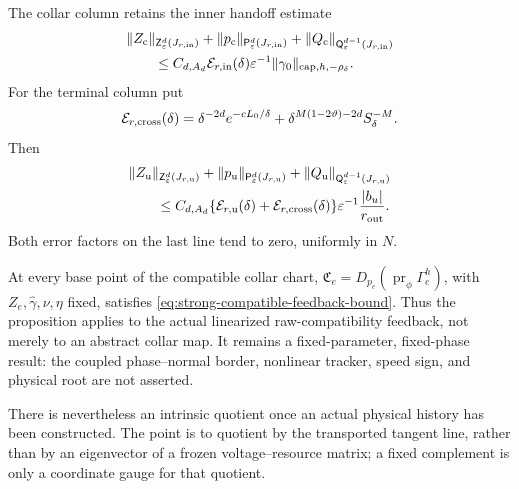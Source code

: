 \begin{proposition}
The collar column retains the inner handoff estimate
\begin{align}
 &\|Z_{\rm c}\|_{\mathsf Z_\varepsilon^d(J_{r,\rm in})}
 +\|p_{\rm c}\|_{\mathsf P_\varepsilon^d(J_{r,\rm in})}
 +\|Q_{\rm c}\|_{\mathsf Q_\varepsilon^{d-1}(J_{r,\rm in})}\notag\\
 &\qquad\le C_{d,A_d}\mathcal E_{r,\rm in}(\delta)
       \varepsilon^{-1}
       \|\gamma_0\|_{\mathrm{cap},h,-\rho_\delta}.          \label{eq:compatible-repelling-inner-column}
\end{align}
For the terminal column put
\begin{equation}
 \mathcal E_{r,\rm cross}(\delta)
 =\delta^{-2d}e^{-cL_0/\delta}
   +\delta^{M(1-2\vartheta)-2d}S_\delta^{-M}.      \label{eq:compatible-repelling-cross-error}
\end{equation}
Then
\begin{align}
 &\|Z_{\rm u}\|_{\mathsf Z_\varepsilon^d(J_{r,\rm u})}
 +\|p_{\rm u}\|_{\mathsf P_\varepsilon^d(J_{r,\rm u})}
 +\|Q_{\rm u}\|_{\mathsf Q_\varepsilon^{d-1}(J_{r,\rm u})}\notag\\
 &\qquad\le C_{d,A_d}
   \{\mathcal E_{r,\rm u}(\delta)
                  +\mathcal E_{r,\rm cross}(\delta)\}
       \varepsilon^{-1}\frac{|b_u|}{r_{\rm out}}.            \label{eq:compatible-repelling-terminal-column}
\end{align}
Both error factors on the last line tend to zero, uniformly in \(N\).

At every base point of the compatible collar chart,
\(\mathfrak C_e=D_{p_e}(\operatorname{pr}_\phi\Gamma_e^h)\), with
\(Z_e,\widehat\gamma,\nu,\eta\) fixed, satisfies
\cref{eq:strong-compatible-feedback-bound}.  Thus the proposition applies
to the actual linearized raw-compatibility feedback, not merely to an
abstract collar map.  It remains a fixed-parameter, fixed-phase result: the
coupled phase--normal border, nonlinear tracker, speed sign, and physical
root are not asserted.
\end{proposition}

There is nevertheless an intrinsic quotient once an actual physical history
has been constructed.  The point is to quotient by the transported tangent
line, rather than by an eigenvector of a frozen voltage--resource matrix; a
fixed complement is only a coordinate gauge for that quotient.

